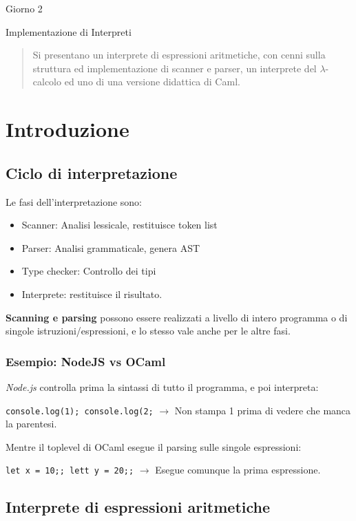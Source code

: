 \documentclass[a4paper,10pt]{article}
\begin{document}
\begin{center}
    \LARGE Giorno 2

    \Large Implementazione di Interpreti
\end{center}\smallskip

\begin{abstract}
Si presentano un interprete di espressioni aritmetiche, con cenni sulla struttura ed implementazione di scanner e parser, un interprete del $\lambda$-calcolo ed uno di una versione didattica di Caml.
\end{abstract}

\section{Introduzione}

\subsection{Ciclo di interpretazione}
Le fasi dell'interpretazione sono:
\begin{itemize}
 \item Scanner: Analisi lessicale, restituisce token list
 \item Parser: Analisi grammaticale, genera AST
 \item Type checker: Controllo dei tipi
 \item Interprete: restituisce il risultato.
\end{itemize}

\textbf{Scanning e parsing} possono essere realizzati a livello di intero programma o di singole istruzioni/espressioni, e lo stesso vale anche per le altre fasi.
\subsubsection{Esempio: NodeJS vs OCaml}

\emph{Node.js} controlla prima la sintassi di tutto il programma, e poi interpreta:\smallskip

\quad \texttt{console.log(1); console.log(2;} $\to$ Non stampa 1 prima di vedere che manca la parentesi.\medskip

Mentre il toplevel di OCaml esegue il parsing sulle singole espressioni:\smallskip

\quad \texttt{let x = 10;; lett y = 20;;} $\to$ Esegue comunque la prima espressione.

\subsection{Interprete di espressioni aritmetiche}
\end{document}
